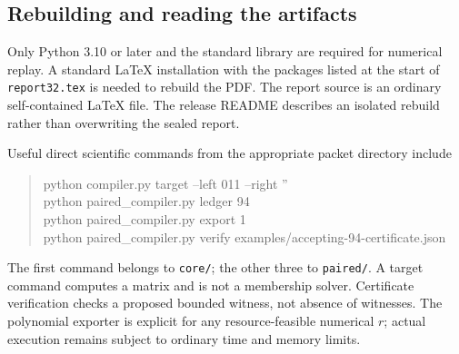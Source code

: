 \documentclass[11pt,letterpaper]{article}
\theoremstyle{definition}
\theoremstyle{remark}
\newcommand{\code}[1]{\nolinkurl{#1}}
\begin{document}
\subsection{Rebuilding and reading the artifacts}
Only Python 3.10 or later and the standard library are required for numerical replay. A standard LaTeX installation with the packages listed at the start of \code{report32.tex} is needed to rebuild the PDF. The report source is an ordinary self-contained LaTeX file. The release README describes an isolated rebuild rather than overwriting the sealed report.

Useful direct scientific commands from the appropriate packet directory include
\begin{quote}\small\ttfamily
python compiler.py target --left 011 --right ''\\
python paired\_compiler.py ledger 94\\
python paired\_compiler.py export 1\\
python paired\_compiler.py verify examples/accepting-94-certificate.json
\end{quote}
The first command belongs to \code{core/}; the other three to \code{paired/}. A target command computes a matrix and is not a membership solver. Certificate verification checks a proposed bounded witness, not absence of witnesses. The polynomial exporter is explicit for any resource-feasible numerical $r$; actual execution remains subject to ordinary time and memory limits.
\end{document}
